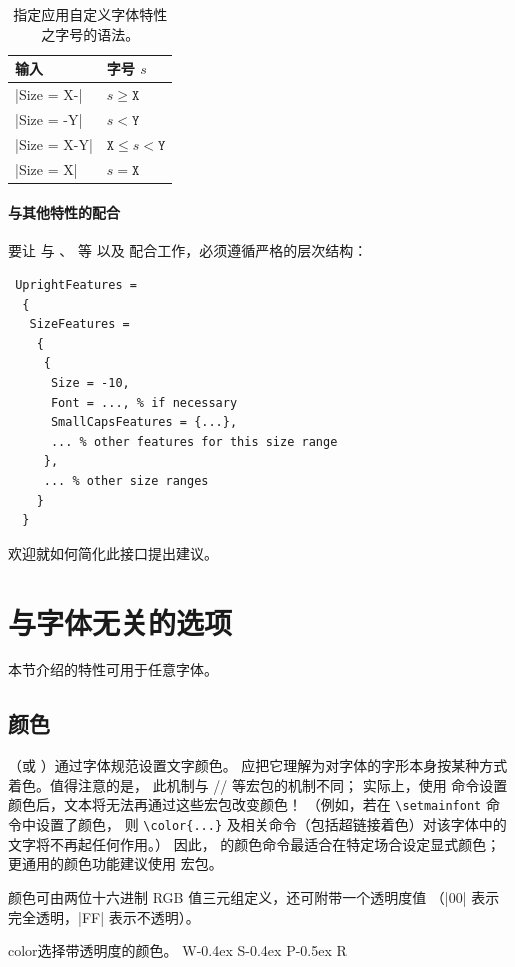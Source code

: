 \documentclass[a4paper]{l3doc}
\begin{document}
\begin{table}
\caption{指定应用自定义字体特性之字号的语法。}\label{tab:sizing}
\centering
\begin{tabular}{@{}ll@{}}
\toprule
输入 & 字号 $s$ \\
\midrule
 |Size = X-| & $s \geq \texttt{X}$ \\
 |Size = -Y| & $s < \texttt{Y}$ \\
 |Size = X-Y| & $\texttt{X} \leq s < \texttt{Y}$ \\
 |Size = X| & $s = \texttt{X}$ \\
\bottomrule
\end{tabular}
\end{table}

\paragraph{与其他特性的配合}
要让  与 、 等
以及  配合工作，必须遵循严格的层次结构：
\begin{Verbatim}
 UprightFeatures =
  {
   SizeFeatures =
    {
     {
      Size = -10,
      Font = ..., % if necessary
      SmallCapsFeatures = {...},
      ... % other features for this size range
     },
     ... % other size ranges
    }
  }
\end{Verbatim}
欢迎就如何简化此接口提出建议。


\section{与字体无关的选项}
\label{sec:font-ind-features}

本节介绍的特性可用于任意字体。

\subsection{颜色}

（或 ）通过字体规范设置文字颜色。
应把它理解为对字体的字形本身按某种方式着色。值得注意的是，
此机制与 // 等宏包的机制不同；
实际上，使用  命令设置颜色后，文本将无法再通过这些宏包改变颜色！
（例如，若在 \verb|\setmainfont| 命令中设置了颜色，
则 \verb|\color{...}| 及相关命令（包括超链接着色）对该字体中的文字将不再起任何作用。）
因此， 的颜色命令最适合在特定场合设定显式颜色；
更通用的颜色功能建议使用  宏包。

颜色可由两位十六进制 RGB 值三元组定义，还可附带一个透明度值
（|00| 表示完全透明，|FF| 表示不透明）。
\begin{Lexample}{color}{选择带透明度的颜色。}
  \fontsize{48}{48}
  {W}\kern-0.4ex
  {S}\kern-0.4ex
  {P}\kern-0.5ex
  {R}
\end{Lexample}
\end{document}
